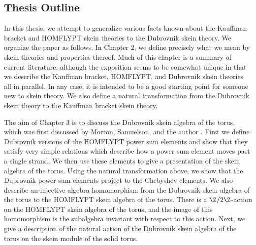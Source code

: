 \subsection{Thesis Outline}

In this thesis, we attempt to generalize various facts known about the Kauffman bracket and HOMFLYPT skein theories to the Dubrovnik skein theory. We organize the paper as follows. In Chapter 2, we define precisely what we mean by skein theories and properties thereof. Much of this chapter is a summary of current literature, although the exposition seems to be somewhat unique in that we describe the Kauffman bracket, HOMFLYPT, and Dubrovnik skein theories all in parallel. In any case, it is intended to be a good starting point for someone new to skein theory. We also define a natural transformation from the Dubrovnik skein theory to the Kauffman bracket skein theory. 

The aim of Chapter 3 is to discuss the Dubrovnik skein algebra of the torus, which was first discussed by Morton, Samuelson, and the author \cite{MPS20}. First we define Dubrovnik versions of the HOMFLYPT power sum elements and show that they satisfy very simple relations which describe how a power sum element moves past a single strand. We then use these elements to give a presentation of the skein algebra of the torus. Using the natural transformation above, we show that the Dubrovnik power sum elements project to the Chebyshev elements. We also describe an injective algebra homomorphism from the Dubrovnik skein algebra of the torus to the HOMFLYPT skein algebra of the torus. There is a $\Z/2\Z$-action on the HOMFLYPT skein algebra of the torus, and the image of this homomorphism is the subalgebra invariant with respect to this action. Next, we give a description of the natural action of the Dubrovnik skein algebra of the torus on the skein module of the solid torus. 

